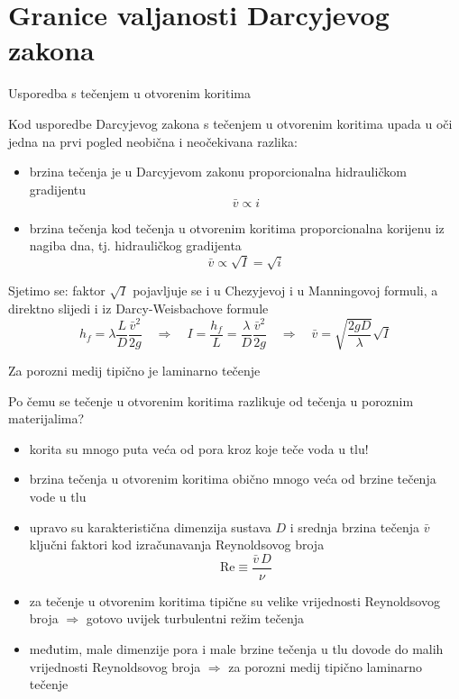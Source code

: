 \documentclass{beamer}
\begin{document}
\section{Granice valjanosti Darcyjevog zakona}
\begin{frame}{Usporedba s tečenjem u otvorenim koritima}
\begin{block}{}
Kod usporedbe Darcyjevog zakona s tečenjem u otvorenim koritima upada
u oči jedna na prvi pogled neobična i neočekivana razlika:
\begin{itemize}
\item brzina tečenja je u Darcyjevom zakonu proporcionalna hidrauličkom
gradijentu 
\[
\bar{v}\propto i
\]
\item brzina tečenja kod tečenja u otvorenim koritima proporcionalna \alert{korijenu}
iz nagiba dna, tj. hidrauličkog gradijenta 
\[
\bar{v}\propto\sqrt{I}=\sqrt{i}
\]
\end{itemize}
\end{block}
Sjetimo se: faktor $\sqrt{I}$ pojavljuje se i u Chezyjevoj i u Manningovoj
formuli, a direktno slijedi i iz Darcy-Weisbachove formule 
\[
h_{f}=\lambda\frac{L}{D}\frac{\bar{v}^{2}}{2g}\quad\Rightarrow\quad I=\frac{h_{f}}{L}=\frac{\lambda}{D}\frac{\bar{v}^{2}}{2g}\quad\Rightarrow\quad\bar{v}=\sqrt{\frac{2gD}{\lambda}}\sqrt{I}
\]

\end{frame}
%
\begin{frame}{Za porozni medij tipično je laminarno tečenje}

Po čemu se tečenje u otvorenim koritima razlikuje od tečenja u poroznim
materijalima? 
\begin{itemize}
\item korita su mnogo puta veća od pora kroz koje teče voda u tlu! 
\item brzina tečenja u otvorenim koritima obično mnogo veća od brzine tečenja
vode u tlu 
\item upravo su karakteristična dimenzija sustava $D$ i srednja brzina
tečenja $\bar{v}$ ključni faktori kod izračunavanja Reynoldsovog
broja 
\[
\text{Re}\equiv\frac{\bar{v}\,D}{\nu}
\]
\item za tečenje u otvorenim koritima tipične su velike vrijednosti Reynoldsovog
broja $\Rightarrow$ gotovo uvijek turbulentni režim tečenja 
\item međutim, male dimenzije pora i male brzine tečenja u tlu dovode do
malih vrijednosti Reynoldsovog broja $\Rightarrow$ za porozni medij
tipično laminarno tečenje 
\end{itemize}
\end{frame}
\end{document}
